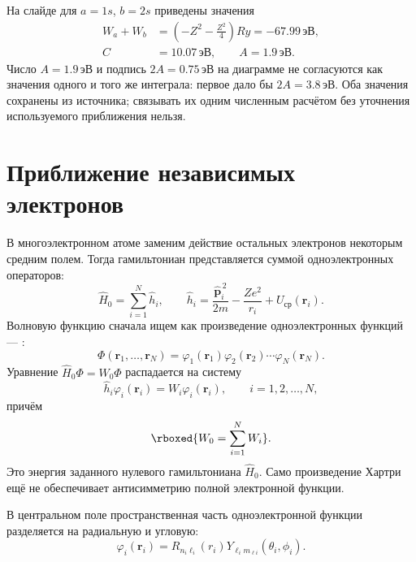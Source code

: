\documentclass[../final.tex]{subfiles}
\begin{document}
На слайде для \(a=1s\), \(b=2s\) приведены значения
\begin{align*}
    W_a+W_b&=\left(-Z^2-\frac{Z^2}{4}\right)Ry
             =-67.99\,\text{эВ},\\
    C&=10.07\,\text{эВ},\qquad A=1.9\,\text{эВ}.
\end{align*}
Число \(A=1.9\,\text{эВ}\) и подпись \(2A=0.75\,\text{эВ}\)
на диаграмме не согласуются как значения одного и того же интеграла:
первое дало бы \(2A=3.8\,\text{эВ}\).
Оба значения сохранены из источника; связывать их одним численным
расчётом без уточнения используемого приближения нельзя.

\section{Приближение независимых электронов}

В многоэлектронном атоме заменим действие остальных электронов
некоторым средним полем. Тогда гамильтониан представляется суммой
одноэлектронных операторов:
\begin{equation*}
    \hat H_0=\sum_{i=1}^{N}\hat h_i,
    \qquad
    \hat h_i=\frac{\hat{\mathbf p}_i^{\,2}}{2m}
             -\frac{Ze^2}{r_i}+U_{\text{ср}}(\mathbf r_i).
\end{equation*}
Волновую функцию сначала ищем как произведение
одноэлектронных функций --- :
\begin{equation*}
    \Phi(\mathbf r_1,\ldots,\mathbf r_N)
    =\varphi_1(\mathbf r_1)\varphi_2(\mathbf r_2)
     \cdots\varphi_N(\mathbf r_N).
\end{equation*}
Уравнение \(\hat H_0\Phi=W_0\Phi\) распадается на систему
\begin{equation*}
    \hat h_i\varphi_i(\mathbf r_i)=W_i\varphi_i(\mathbf r_i),
    \qquad i=1,2,\ldots,N,
\end{equation*}
причём
\begin{equation*}
    \rboxed{W_0=\sum_{i=1}^{N}W_i}.
\end{equation*}
Это энергия заданного нулевого гамильтониана \(\hat H_0\).
Само произведение Хартри ещё не обеспечивает антисимметрию
полной электронной функции.

В центральном поле пространственная часть одноэлектронной функции
разделяется на радиальную и угловую:
\begin{equation*}
    \varphi_i(\mathbf r_i)
    =R_{n_i\ell_i}(r_i)Y_{\ell_i m_{\ell i}}(\theta_i,\phi_i).
\end{equation*}
\end{document}
